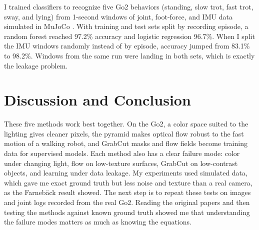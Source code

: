 \documentclass[11pt]{article}
\begin{document}
I trained classifiers to recognize five Go2 behaviors (standing, slow trot, fast trot, sway, and lying) from 1-second
windows of joint, foot-force, and IMU data simulated in MuJoCo \cite{mujoco}. With training and test sets split by
recording episode, a random forest reached 97.2\% accuracy and logistic regression 96.7\%. When I split the IMU windows randomly instead of by episode, accuracy jumped from 83.1\% to 98.2\%. Windows from
the same run were landing in both sets, which is exactly the leakage problem.

\section{Discussion and Conclusion}
These five methods work best together. On the Go2, a color space suited to the lighting gives cleaner pixels, the pyramid
makes optical flow robust to the fast motion of a walking robot, and GrabCut masks and flow fields become training data for
supervised models. Each method also has a clear failure mode: color under changing light, flow on low-texture surfaces,
GrabCut on low-contrast objects, and learning under data leakage. My experiments used simulated data, which gave me exact
ground truth but less noise and texture than a real camera, as the Farneb\"ack result showed. The next step is to repeat
these tests on images and joint logs recorded from the real Go2. Reading the original papers and then testing the methods
against known ground truth showed me that understanding the failure modes matters as much as knowing the equations.
\end{document}
